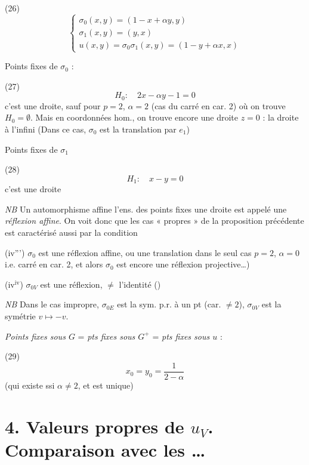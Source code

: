 \documentclass[11pt,a4paper]{article}
\begin{document}
(26)
\[
\begin{cases}
\sigma_0(x,y) = (1 - x + \alpha y, y) \\
\sigma_1(x,y) = (y,x) \\
u(x,y) = \sigma_0 \sigma_1(x,y) = (1 - y + \alpha x, x)
\end{cases}
\]


Points fixes de $\sigma_0$ :

(27)
\[
H_0 : \quad 2x - \alpha y - 1 = 0
\]
c'est une droite, sauf pour $p = 2$, $\alpha = 2$ (cas du carré en car. 2) où on trouve $H_0 = \emptyset$. Mais  en coordonnées hom., on trouve encore une droite $z = 0$ : la droite à l'infini (Dans ce cas, $\sigma_0$ est la translation par \ill{} $e_1$)

Points fixes de $\sigma_1$

(28)
\[
H_1 : \quad x - y = 0
\]
c'est une droite

\emph{NB} Un automorphisme affine   l'ens. des points fixes  une droite est appelé une \emph{réflexion affine}. On voit donc que les cas « propres » de la proposition précédente est caractérisé aussi par la condition

(iv''') $\sigma_0$ est une réflexion affine, ou \struck{\ill{}} une translation   dans le seul cas $p = 2$, $\alpha = 0$ i.e. carré en car. 2, et alors $\sigma_0$ est encore une réflexion projective…)

(iv$^{\text{iv}}$) $\sigma_{0V}$ est une réflexion, $\neq$ l'identité (\ill{})

\emph{NB} Dans le cas impropre, $\sigma_{0E}$ est la sym. p.r. à un pt (car. $\neq 2$), $\sigma_{0V}$ est la symétrie $v \mapsto -v$.

\emph{Points fixes sous $G$} = \emph{pts fixes sous $G^+$} = \emph{pts fixes sous $u$} :

(29)
\[
x_0 = y_0 = \frac{1}{2-\alpha}
\]
(qui existe ssi $\alpha \neq 2$, et est \ill{} unique)


\section*{4. Valeurs propres de $u_V$. Comparaison avec les \ill{}…}
\end{document}
